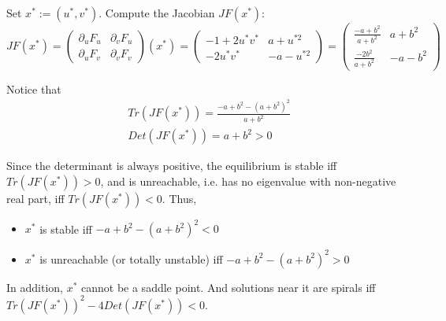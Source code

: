 \documentclass{article}
\begin{document}
Set $x^*:=(u^*,v^*)$. Compute the Jacobian $JF(x^*)$:
\begin{equation*}
	JF(x^*)=
	\left(
	\begin{array}{cc}
	\partial_u F_u & \partial_v F_u \\
	\partial_u F_v & \partial_v F_v
	\end{array}
	\right)(x^*)
	=
	\left(
	\begin{array}{cc}
		-1+2u^{*} v^{*} & a+u^{*2} \\
		-2u^{*} v^{*} & -a-u^{*2}
	\end{array}
	\right)
	=
	\left(
	\begin{array}{cc}
		\frac{-a+b^2}{a+b^2} & a+b^2 \\
		\frac{-2b^2}{a+b^2} & -a-b^2
	\end{array}
	\right)
\end{equation*}

Notice that 
\begin{align*}
	&Tr(JF(x^*))=\frac{-a+b^2-(a+b^2)^2}{a+b^2} \\
	&Det(JF(x^*))=a+b^2>0
\end{align*}

Since the determinant is always positive, the equilibrium is stable iff $Tr(JF(x^*))>0$, and is unreachable, i.e. has no eigenvalue with non-negative real part, iff $Tr(JF(x^*))<0$. Thus,

\begin{itemize}
	\item $x^*$ is stable iff $-a+b^2-(a+b^2)^2<0$
	\item $x^*$ is unreachable (or totally unstable) iff $-a+b^2-(a+b^2)^2>0$
\end{itemize}

In addition, $x^*$ cannot be a saddle point. And solutions near it are spirals iff $Tr(JF(x^*))^2-4Det(JF(x^*))<0$.
\end{document}
